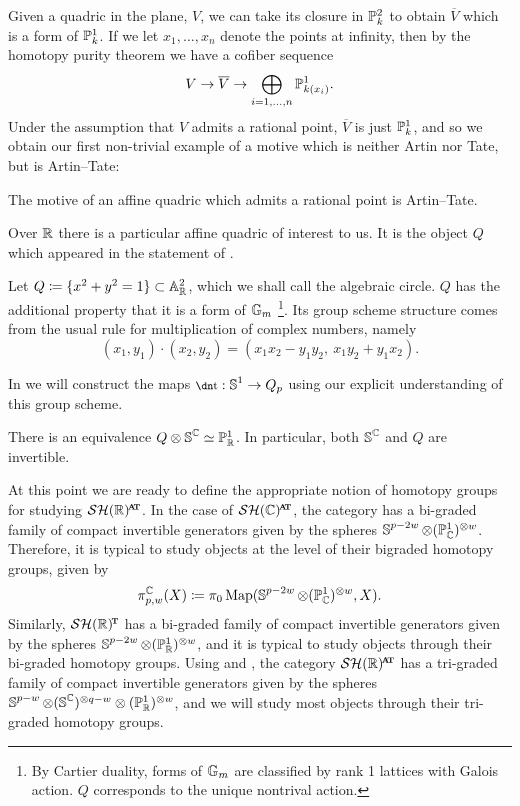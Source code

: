 Given a quadric in the plane, $V$, we can take its closure in $\P_k^2$ to obtain $\overline{V}$ which is a form of $\P_k^1$. If we let $x_1,\dots,x_n$ denote the points at infinity, then by the homotopy purity theorem \cite[Theorem 3.2.23]{MorelVoevodsky} we have a cofiber sequence
\[ V \to \overline{V} \to \bigoplus_{i=1,\dots,n} \P_{k(x_i)}^1. \]
Under the assumption that $V$ admits a rational point, $\overline{V}$ is just $\P^1_k$, and so we obtain our first non-trivial example of a motive which is neither Artin nor Tate, but is Artin--Tate:

\begin{exm}
  The motive of an affine quadric which admits a rational point is Artin--Tate.
\end{exm}

Over $\R$ there is a particular affine quadric of interest to us.
It is the object $Q$ which appeared in the statement of .

\begin{exm}
  Let $Q \coloneqq \{x^2+y^2=1\} \subset \AA^2 _{\R}$, which we shall call the algebraic circle.
  $Q$ has the additional property that it is a form of $\G_m$ \footnote{By Cartier duality, forms of $\G_m$ are classified by rank 1 lattices with Galois action. $Q$ corresponds to the unique nontrival action.}.
  Its group scheme structure comes from the usual rule for multiplication of complex numbers,
  namely
  \[ (x_1,y_1) \cdot (x_2,y_2) = (x_1 x_2 - y_1 y_2,\ x_1 y_2 + y_1 x_2). \]

  In  we will construct the maps $\ta: \Ss^1 \to Q_p$ using our explicit understanding of this group scheme.
\end{exm}

\begin{prop} \label{prop:pic-Q}
  There is an equivalence $Q \otimes \Ss^\C \simeq \P^1 _\R$.
  In particular, both $\Ss^\C$ and $Q$ are invertible.
\end{prop}

At this point we are ready to define the appropriate notion of homotopy groups for studying $\SHR^{\at}$.
In the case of $\SHC^{\at}$, the category has a bi-graded family of compact invertible generators given by the spheres $\Ss^{p - 2w} \otimes (\P_\C^1)^{\otimes w}$. Therefore, it is typical to study objects at the level of their bigraded homotopy groups, given by
\[ \pi_{p,w}^\C(X) \coloneqq \pi_0\Map ( \Ss^{p-2w} \otimes (\P_\C^1)^{\otimes w}, X ). \]
Similarly, $\SHRt$ has a bi-graded family of compact invertible generators given by the spheres $\Ss^{p-2w} \otimes (\P_\R^1)^{\otimes w}$, and it is typical to study objects through their bi-graded homotopy groups.
Using  and , the category $\SHR^{\at}$ has a tri-graded family of compact invertible generators given by the spheres $\Ss^{p-w} \otimes (\Ss^\C)^{\otimes q-w} \otimes (\P_\R^1)^{\otimes w}$, and we will study most objects through their tri-graded homotopy groups.

